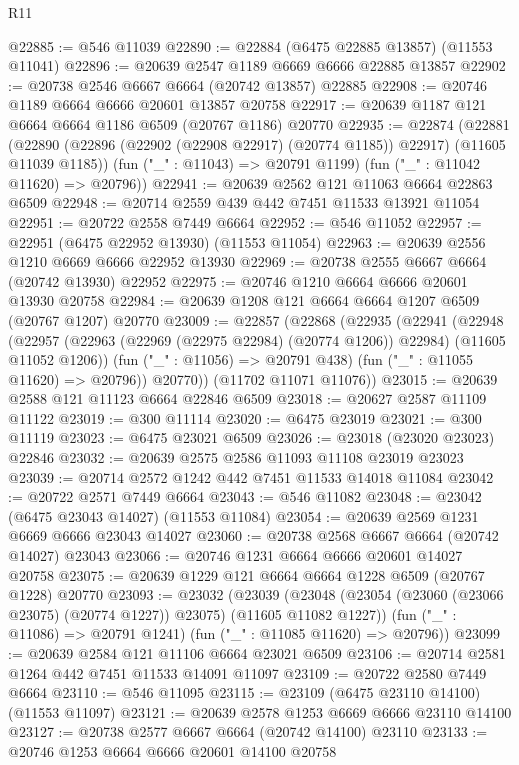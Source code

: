 \begin{lexlean}{R11}
\begin{coremodule}
@22885 := @546 @11039
@22890 := @22884 (@6475 @22885 @13857) (@11553 @11041)
@22896 := @20639 @2547 @1189 @6669 @6666 @22885 @13857
@22902 := @20738 @2546 @6667 @6664 (@20742 @13857) @22885
@22908 := @20746 @1189 @6664 @6666 @20601 @13857 @20758
@22917 := @20639 @1187 @121 @6664 @6664 @1186 @6509 (@20767 @1186) @20770
@22935 := @22874
    (@22881
      (@22890 (@22896 (@22902 (@22908 @22917) (@20774 @1185)) @22917) (@11605 @11039 @1185))
      (fun ("_" : @11043) => @20791 @1199)
      (fun ("_" : @11042 @11620) => @20796))
@22941 := @20639 @2562 @121 @11063 @6664 @22863 @6509
@22948 := @20714 @2559 @439 @442 @7451 @11533 @13921 @11054
@22951 := @20722 @2558 @7449 @6664
@22952 := @546 @11052
@22957 := @22951 (@6475 @22952 @13930) (@11553 @11054)
@22963 := @20639 @2556 @1210 @6669 @6666 @22952 @13930
@22969 := @20738 @2555 @6667 @6664 (@20742 @13930) @22952
@22975 := @20746 @1210 @6664 @6666 @20601 @13930 @20758
@22984 := @20639 @1208 @121 @6664 @6664 @1207 @6509 (@20767 @1207) @20770
@23009 := @22857
    (@22868
      (@22935
        (@22941
          (@22948
            (@22957 (@22963 (@22969 (@22975 @22984) (@20774 @1206)) @22984) (@11605 @11052 @1206))
            (fun ("_" : @11056) => @20791 @438)
            (fun ("_" : @11055 @11620) => @20796))
          @20770))
      (@11702 @11071 @11076))
@23015 := @20639 @2588 @121 @11123 @6664 @22846 @6509
@23018 := @20627 @2587 @11109 @11122
@23019 := @300 @11114
@23020 := @6475 @23019
@23021 := @300 @11119
@23023 := @6475 @23021 @6509
@23026 := @23018 (@23020 @23023) @22846
@23032 := @20639 @2575 @2586 @11093 @11108 @23019 @23023
@23039 := @20714 @2572 @1242 @442 @7451 @11533 @14018 @11084
@23042 := @20722 @2571 @7449 @6664
@23043 := @546 @11082
@23048 := @23042 (@6475 @23043 @14027) (@11553 @11084)
@23054 := @20639 @2569 @1231 @6669 @6666 @23043 @14027
@23060 := @20738 @2568 @6667 @6664 (@20742 @14027) @23043
@23066 := @20746 @1231 @6664 @6666 @20601 @14027 @20758
@23075 := @20639 @1229 @121 @6664 @6664 @1228 @6509 (@20767 @1228) @20770
@23093 := @23032
    (@23039
      (@23048 (@23054 (@23060 (@23066 @23075) (@20774 @1227)) @23075) (@11605 @11082 @1227))
      (fun ("_" : @11086) => @20791 @1241)
      (fun ("_" : @11085 @11620) => @20796))
@23099 := @20639 @2584 @121 @11106 @6664 @23021 @6509
@23106 := @20714 @2581 @1264 @442 @7451 @11533 @14091 @11097
@23109 := @20722 @2580 @7449 @6664
@23110 := @546 @11095
@23115 := @23109 (@6475 @23110 @14100) (@11553 @11097)
@23121 := @20639 @2578 @1253 @6669 @6666 @23110 @14100
@23127 := @20738 @2577 @6667 @6664 (@20742 @14100) @23110
@23133 := @20746 @1253 @6664 @6666 @20601 @14100 @20758

\end{coremodule}
\end{lexlean}
